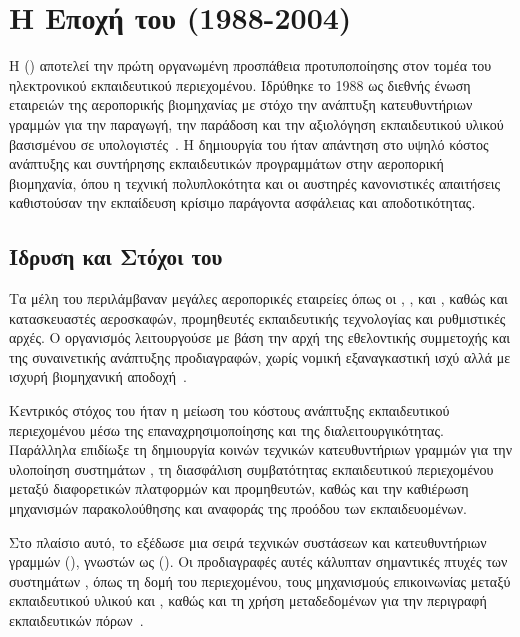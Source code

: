 \section{Η Εποχή του  (1988-2004)}
\label{sec:aicc_era}

Η \textit{    } () αποτελεί την πρώτη οργανωμένη προσπάθεια προτυποποίησης στον τομέα του ηλεκτρονικού εκπαιδευτικού περιεχομένου. Ιδρύθηκε το 1988 ως διεθνής ένωση εταιρειών της αεροπορικής βιομηχανίας με στόχο την ανάπτυξη κατευθυντήριων γραμμών για την παραγωγή, την παράδοση και την αξιολόγηση εκπαιδευτικού υλικού βασισμένου σε υπολογιστές~\cite{wiki_aicc,growtheng2024aicc}. Η δημιουργία του  ήταν απάντηση στο υψηλό κόστος ανάπτυξης και συντήρησης εκπαιδευτικών προγραμμάτων στην αεροπορική βιομηχανία, όπου η τεχνική πολυπλοκότητα και οι αυστηρές κανονιστικές απαιτήσεις καθιστούσαν την εκπαίδευση κρίσιμο παράγοντα ασφάλειας και αποδοτικότητας.

\subsection{Ίδρυση και Στόχοι του }
\label{subsec:aicc_foundation}

Τα μέλη του  περιλάμβαναν μεγάλες αεροπορικές εταιρείες όπως οι , ,   και , καθώς και κατασκευαστές αεροσκαφών, προμηθευτές εκπαιδευτικής τεχνολογίας και ρυθμιστικές αρχές. Ο οργανισμός λειτουργούσε με βάση την αρχή της εθελοντικής συμμετοχής και της συναινετικής ανάπτυξης προδιαγραφών, χωρίς νομική εξαναγκαστική ισχύ αλλά με ισχυρή βιομηχανική αποδοχή~\cite{elearningindustry2024standards}.

Κεντρικός στόχος του  ήταν η μείωση του κόστους ανάπτυξης εκπαιδευτικού περιεχομένου μέσω της επαναχρησιμοποίησης και της διαλειτουργικότητας. Παράλληλα επιδίωξε τη δημιουργία κοινών τεχνικών κατευθυντήριων γραμμών για την υλοποίηση συστημάτων , τη διασφάλιση συμβατότητας εκπαιδευτικού περιεχομένου μεταξύ διαφορετικών πλατφορμών και προμηθευτών, καθώς και την καθιέρωση μηχανισμών παρακολούθησης και αναφοράς της προόδου των εκπαιδευομένων.

Στο πλαίσιο αυτό, το  εξέδωσε μια σειρά τεχνικών συστάσεων και κατευθυντήριων γραμμών (\textit{}), γνωστών ως \textit{   } (\textit{}). Οι προδιαγραφές αυτές κάλυπταν σημαντικές πτυχές των συστημάτων , όπως τη δομή του περιεχομένου, τους μηχανισμούς επικοινωνίας μεταξύ εκπαιδευτικού υλικού και , καθώς και τη χρήση μεταδεδομένων για την περιγραφή εκπαιδευτικών πόρων~\cite{paradiso2024aicc,teachfloor2024aicc}.


